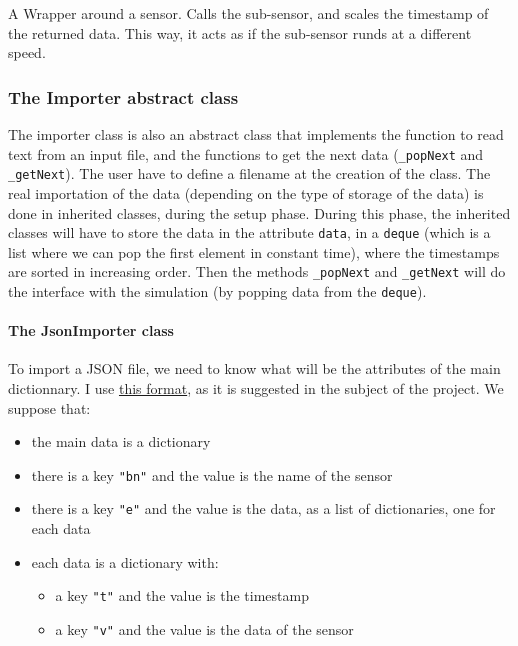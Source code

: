 A Wrapper around a sensor. Calls the sub-sensor, and scales the timestamp of
the returned data. This way, it acts as if the sub-sensor runds at a different
speed.

\subsubsection{The Importer abstract class}

The importer class is also an abstract class that implements the function
to read text from an input file, and the functions to get the next data
(\verb!_popNext! and \verb!_getNext!). The user have to define a filename
at the creation of the class. The real importation of the data (depending
on the type of storage of the data) is done in inherited classes, during the
setup phase. During this phase, the inherited classes will have to store the
data in the attribute \verb!data!, in a \verb!deque! (which is a list where we can pop the first element in constant time), where the timestamps are sorted in increasing order. Then the methods
\verb!_popNext! and \verb!_getNext! will do the interface with the simulation
(by popping data from the \verb!deque!).

\paragraph{The JsonImporter class}

To import a JSON file, we need to know what
will be the attributes of the main dictionnary. I use
\href{https://github.com/SINTEF-9012/sensapp/tree/master/net.modelbased.sensapp.data.samples/CyclingData}{this format}, as it is suggested in the subject of the project. We suppose that:

\begin{itemize}
\item the main data is a dictionary
\item there is a key \verb!"bn"! and the value is the name of the sensor
\item there is a key \verb!"e"! and the value is the data, as a list of dictionaries, one for each data
\item each data is a dictionary with:
      \begin{itemize}
      \item a key \verb!"t"! and the value is the timestamp
      \item a key \verb!"v"! and the value is the data of the sensor
      \end{itemize}
\end{itemize}

